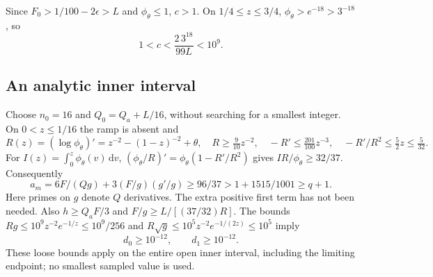 \documentclass[aps,prd,reprint,onecolumn,notitlepage,nofootinbib,longbibliography,floatfix]{revtex4-2}
\theoremstyle{scstyle}
\theoremstyle{definition}
\theoremstyle{remark}
\newcommand{\dd}{\mathrm{d}}
\begin{document}
Since $F_0>1/100-2\epsilon>L$ and $\phi_\theta\le1$, $c>1$.
On $1/4\le z\le3/4$, $\phi_\theta>e^{-18}>3^{-18}$, so
\begin{equation}
 1<c<\frac{2\,3^{18}}{99L}<10^9.
 \label{eq:certNormalization}
\end{equation}

\subsection{An analytic inner interval}
Choose $n_0=16$ and $Q_0=Q_a+L/16$, without searching for a smallest
integer. On $0<z\le1/16$ the ramp is absent and
\begin{equation}
 R(z)=(\log\phi_\theta)'=z^{-2}-(1-z)^{-2}+\theta,
 \quad R\ge\tfrac9{10}z^{-2},\quad
 -R'\le\tfrac{201}{100}z^{-3},\quad -R'/R^2\le\tfrac52z\le\tfrac5{32}.
\end{equation}
For $I(z)=\int_0^z\phi_\theta(v)\,\dd v$,
$(\phi_\theta/R)'=\phi_\theta(1-R'/R^2)$ gives
$I R/\phi_\theta\ge32/37$. Consequently
\begin{equation}
 a_m=6F/(Qg)+3(F/g)(g'/g)\ge96/37
 >1+1515/1001\ge q+1.
\end{equation}
Here primes on $g$ denote $Q$ derivatives. The extra positive first term
has not been needed. Also $h\ge Q_aF/3$ and
$F/g\ge L/[(37/32)R]$. The bounds
$Rg\le10^9z^{-2}e^{-1/z}\le10^9/256$ and
$R\sqrt g\le10^5z^{-2}e^{-1/(2z)}\le10^5$ imply
\begin{equation}
 d_0\ge10^{-12},\qquad d_1\ge10^{-12}.
\end{equation}
These loose bounds apply on the entire open inner interval, including
the limiting endpoint; no smallest sampled value is used.
\end{document}
